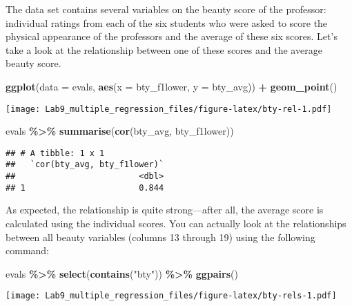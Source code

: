 \documentclass[
]{article}
\newenvironment{Shaded}{\begin{snugshade}}{\end{snugshade}}
\newcommand{\AttributeTok}[1]{\textcolor[rgb]{0.13,0.29,0.53}{#1}}
\newcommand{\FunctionTok}[1]{\textcolor[rgb]{0.13,0.29,0.53}{\textbf{#1}}}
\newcommand{\NormalTok}[1]{#1}
\newcommand{\SpecialCharTok}[1]{\textcolor[rgb]{0.81,0.36,0.00}{\textbf{#1}}}
\newcommand{\StringTok}[1]{\textcolor[rgb]{0.31,0.60,0.02}{#1}}
\begin{document}
The data set contains several variables on the beauty score of the
professor: individual ratings from each of the six students who were
asked to score the physical appearance of the professors and the average
of these six scores. Let's take a look at the relationship between one
of these scores and the average beauty score.

\begin{Shaded}
\begin{Highlighting}[]
\FunctionTok{ggplot}\NormalTok{(}\AttributeTok{data =}\NormalTok{ evals, }\FunctionTok{aes}\NormalTok{(}\AttributeTok{x =}\NormalTok{ bty\_f1lower, }\AttributeTok{y =}\NormalTok{ bty\_avg)) }\SpecialCharTok{+}
  \FunctionTok{geom\_point}\NormalTok{()}
\end{Highlighting}
\end{Shaded}

\texttt{[image: Lab9\_multiple\_regression\_files/figure-latex/bty-rel-1.pdf]}

\begin{Shaded}
\begin{Highlighting}[]
\NormalTok{evals }\SpecialCharTok{\%\textgreater{}\%} 
  \FunctionTok{summarise}\NormalTok{(}\FunctionTok{cor}\NormalTok{(bty\_avg, bty\_f1lower))}
\end{Highlighting}
\end{Shaded}

\begin{verbatim}
## # A tibble: 1 x 1
##   `cor(bty_avg, bty_f1lower)`
##                         <dbl>
## 1                       0.844
\end{verbatim}

As expected, the relationship is quite strong---after all, the average
score is calculated using the individual scores. You can actually look
at the relationships between all beauty variables (columns 13 through
19) using the following command:

\begin{Shaded}
\begin{Highlighting}[]
\NormalTok{evals }\SpecialCharTok{\%\textgreater{}\%}
  \FunctionTok{select}\NormalTok{(}\FunctionTok{contains}\NormalTok{(}\StringTok{"bty"}\NormalTok{)) }\SpecialCharTok{\%\textgreater{}\%}
  \FunctionTok{ggpairs}\NormalTok{()}
\end{Highlighting}
\end{Shaded}

\texttt{[image: Lab9\_multiple\_regression\_files/figure-latex/bty-rels-1.pdf]}
\end{document}
